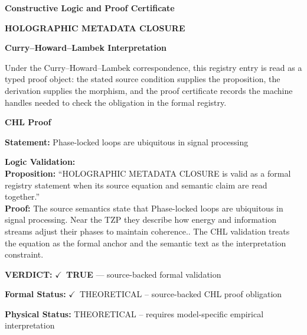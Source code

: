 \clearpage
\begingroup\tzpsupportsetup
\noindent\textbf{\fontsize{10.8pt}{12.8pt}\selectfont [ID 0529] Constructive Logic and Proof Certificate}\par
\noindent\textbf{\fontsize{10pt}{12pt}\selectfont HOLOGRAPHIC METADATA CLOSURE}\par
\vspace{0.45em}
\begingroup
\footnotesize
\setlength{\parskip}{0.22em}
\setlength{\parindent}{0pt}
\noindent\textbf{Curry--Howard--Lambek Interpretation}\par
Under the Curry--Howard--Lambek correspondence, this registry entry is read as a typed proof
object: the stated source condition supplies the proposition, the derivation supplies the
morphism, and the proof certificate records the machine handles needed to check the obligation
in the formal registry.

\vspace{0.45em}
\noindent\textbf{CHL Proof}\par
\textbf{Statement:} Phase-locked loops are ubiquitous in signal processing

\textbf{Logic Validation:}\\
\textbf{Proposition:} ``HOLOGRAPHIC METADATA CLOSURE is valid as a formal registry statement when its source
equation and semantic claim are read together.''\\
\textbf{Proof:} The source semantics state that Phase-locked loops are ubiquitous in signal processing.
Near the TZP they describe how energy and information streams adjust their phases to
maintain coherence.. The CHL validation treats the equation as the formal anchor and the
semantic text as the interpretation constraint.

\textbf{VERDICT:} \ensuremath{\checkmark}\ \textbf{TRUE} --- source-backed formal validation

\textbf{Formal Status:} \ensuremath{\checkmark}\ THEORETICAL -- source-backed CHL proof obligation

\textbf{Physical Status:} THEORETICAL -- requires model-specific empirical interpretation
\par\vspace{0.45em}
\par
\ifTZPDarkEdition
{}
\fi
\endgroup
\endgroup
